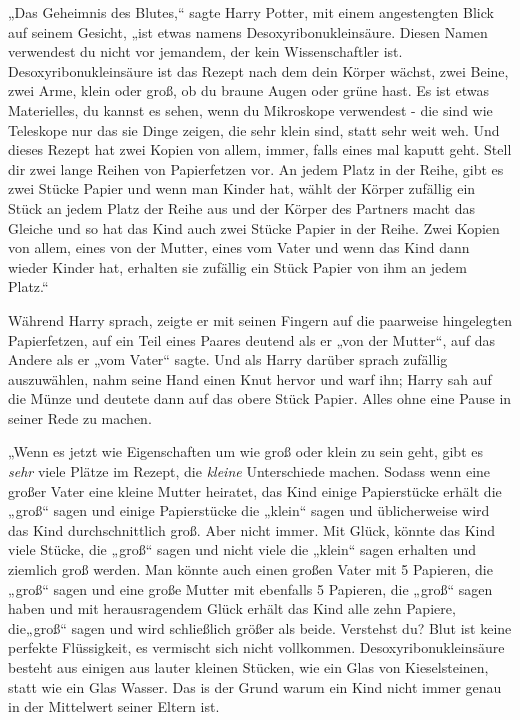 {„Das Geheimnis des Blutes,“ sagte Harry Potter, mit einem angestengten Blick auf seinem Gesicht, „ist etwas namens Desoxyribonukleinsäure. Diesen Namen verwendest du nicht vor jemandem, der kein Wissenschaftler ist. Desoxyribonukleinsäure ist das Rezept nach dem dein Körper wächst, zwei Beine, zwei Arme, klein oder groß, ob du braune Augen oder grüne hast. Es ist etwas Materielles, du kannst es sehen, wenn du Mikroskope verwendest - die sind wie Teleskope nur das sie Dinge zeigen, die sehr klein sind, statt sehr weit weh. Und dieses Rezept hat zwei Kopien von allem, immer, falls eines mal kaputt geht. Stell dir zwei lange Reihen von Papierfetzen vor. An jedem Platz in der Reihe, gibt es zwei Stücke Papier und wenn man Kinder hat, wählt der Körper zufällig ein Stück an jedem Platz der Reihe aus und der Körper des Partners macht das Gleiche und so hat das Kind auch zwei Stücke Papier in der Reihe. Zwei Kopien von allem, eines von der Mutter, eines vom Vater und wenn das Kind dann wieder Kinder hat, erhalten sie zufällig ein Stück Papier von ihm an jedem Platz.“

Während Harry sprach, zeigte er mit seinen Fingern auf die paarweise hingelegten Papierfetzen, auf ein Teil eines Paares deutend als er „von der Mutter“, auf das Andere als er „vom Vater“ sagte. Und als Harry darüber sprach zufällig auszuwählen, nahm seine Hand einen Knut hervor und warf ihn; Harry sah auf die Münze und deutete dann auf das obere Stück Papier. Alles ohne eine Pause in seiner Rede zu machen.

„Wenn es jetzt wie Eigenschaften um wie groß oder klein zu sein geht, gibt es \emph{sehr} viele Plätze im Rezept, die \emph{kleine} Unterschiede machen. Sodass wenn eine großer Vater eine kleine Mutter heiratet, das Kind einige Papierstücke erhält die „groß“ sagen und einige Papierstücke die „klein“ sagen und üblicherweise wird das Kind durchschnittlich groß. Aber nicht immer. Mit Glück, könnte das Kind viele Stücke, die „groß“ sagen und nicht viele die „klein“ sagen erhalten und ziemlich groß werden. Man könnte auch einen großen Vater mit 5 Papieren, die „groß“ sagen und eine große Mutter mit ebenfalls 5 Papieren, die „groß“ sagen haben und mit herausragendem Glück erhält das Kind alle zehn Papiere, die„groß“ sagen und wird schließlich größer als beide. Verstehst du? Blut ist keine perfekte Flüssigkeit, es vermischt sich nicht vollkommen. Desoxyribonukleinsäure besteht aus einigen aus lauter kleinen Stücken, wie ein Glas von Kieselsteinen, statt wie ein Glas Wasser. Das is der Grund warum ein Kind nicht immer genau in der Mittelwert seiner Eltern ist.

}
